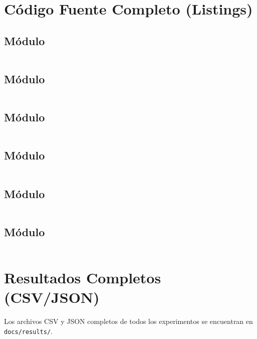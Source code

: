 
\chapter{Código Fuente Completo (Listings)}
\label{ap:codigo}
\section{Módulo }
\inputminted{python}{../../src/tactical_grid/domain/rules.py}

\section{Módulo }
\inputminted{python}{../../src/tactical_grid/algorithms/informed.py}

\section{Módulo }
\inputminted{python}{../../src/tactical_grid/algorithms/adversarial.py}

\section{Módulo }
\inputminted{python}{../../src/tactical_grid/algorithms/utility.py}

\section{Módulo }
\inputminted{python}{../../src/tactical_grid/scenario/loader.py}

\section{Módulo }
\inputminted{python}{../../src/tactical_grid/experiments/verifier.py}

\chapter{Resultados Completos (CSV/JSON)}
\label{ap:resultados}
Los archivos CSV y JSON completos de todos los experimentos se encuentran en \texttt{docs/results/}.

